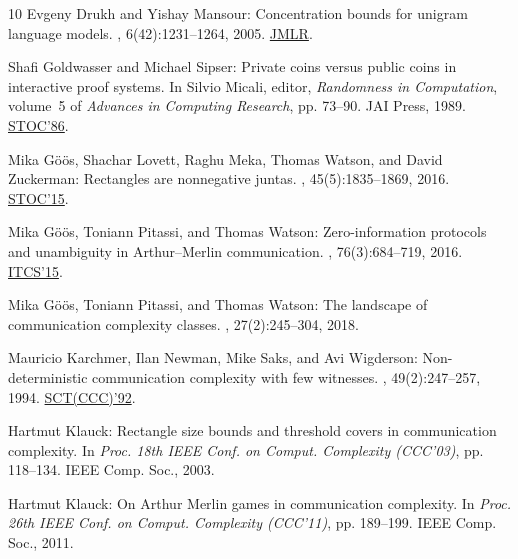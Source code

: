 \begin{thebibliography}{10}
{\sc Evgeny Drukh and Yishay Mansour}: Concentration bounds for unigram
  language models.
, 6(42):1231--1264, 2005.
\newblock \href{https://jmlr.org/papers/v6/drukh05a.html}{JMLR}.

{\sc Shafi Goldwasser and Michael Sipser}: Private coins versus public coins in
  interactive proof systems.
\newblock In {\sc Silvio Micali}, editor, {\em Randomness in Computation},
  volume~5 of {\em Advances in Computing Research}, pp. 73--90. JAI Press,
  1989.
\newblock \prelim \href{https://doi.org/10.1145/12130.12137}{STOC'86}.

{\sc Mika G\"o\"os, Shachar Lovett, Raghu Meka, Thomas Watson, and David
  Zuckerman}: Rectangles are nonnegative juntas.
, 45(5):1835--1869, 2016.
\newblock \prelim \href{https://doi.org/10.1145/2746539.2746596}{STOC'15}.
\newblock [\epfmtdoi{10.1137/15M103145X}]

{\sc Mika G\"o\"os, Toniann Pitassi, and Thomas Watson}: Zero-information
  protocols and unambiguity in {A}rthur--{M}erlin communication.
, 76(3):684--719, 2016.
\newblock \prelim \href{https://doi.org/10.1145/2688073.2688074}{ITCS'15}.
\newblock [\epfmtdoi{10.1007/s00453-015-0104-9}]

{\sc Mika G\"o\"os, Toniann Pitassi, and Thomas Watson}: The landscape of
  communication complexity classes.
, 27(2):245--304, 2018.
\newblock [\epfmtdoi{10.1007/s00037-018-0166-6}]

{\sc Mauricio Karchmer, Ilan Newman, Mike Saks, and Avi Wigderson}:
  Non-deterministic communication complexity with few witnesses.
, 49(2):247--257, 1994.
\newblock \prelim \href{https://doi.org/10.1109/SCT.1992.215402}{SCT(CCC)'92}.
\newblock [\epfmtdoi{10.1016/S0022-0000(05)80049-2}]

{\sc Hartmut Klauck}: Rectangle size bounds and threshold covers in
  communication complexity.
\newblock In {\em Proc. 18th IEEE Conf. on Comput. Complexity (CCC'03)}, pp.
  118--134. IEEE Comp. Soc., 2003.

{\sc Hartmut Klauck}: On {A}rthur {M}erlin games in communication complexity.
\newblock In {\em Proc. 26th IEEE Conf. on Comput. Complexity (CCC'11)}, pp.
  189--199. IEEE Comp. Soc., 2011.


\end{thebibliography}
